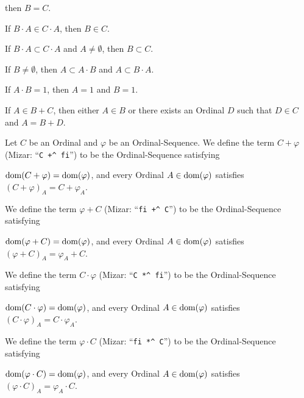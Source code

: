 \documentclass{article}
\begin{document}
\begin{thm}
  then $B=C$.
\item\label{ordinal3:34} If $B\cdot A\in C\cdot A$, then $B\in C$.
\item\label{ordinal3:35} If $B\cdot A\subset C\cdot A$ and $A\neq\emptyset$,
  then $B\subset C$.
\item\label{ordinal3:36} If $B\neq\emptyset$, then $A\subset A\cdot B$
  and $A\subset B\cdot A$.
\item\label{ordinal3:37} If $A\cdot B=1$, then $A=1$ and $B=1$.
\item\label{ordinal3:38} If $A\in B+C$,
  then either $A\in B$ or there exists an Ordinal $D$ such that $D\in C$
  and $A=B+D$.
\end{thm}

\begin{definition}
Let $C$ be an Ordinal and $\varphi$ be an Ordinal-Sequence.
We define the term $C+\varphi$ (Mizar: ``\verb#C +^ fi#'') to be the
Ordinal-Sequence satisfying
\begin{defn}
\item $\operatorname{dom}(C+\varphi)=\operatorname{dom}(\varphi)$, and every Ordinal $A\in\operatorname{dom}(\varphi)$
  satisfies $(C+\varphi)_{A}=C+\varphi_{A}$.
\end{defn}
We define the term $\varphi+C$ (Mizar: ``\verb#fi +^ C#'') to be the
Ordinal-Sequence satisfying
\begin{defn}
\item $\operatorname{dom}(\varphi+C)=\operatorname{dom}(\varphi)$, and every Ordinal $A\in\operatorname{dom}(\varphi)$
  satisfies $(\varphi+C)_{A}=\varphi_{A}+C$.
\end{defn}
We define the term $C\cdot\varphi$ (Mizar: ``\verb#C *^ fi#'') to be the
Ordinal-Sequence satisfying
\begin{defn}
\item $\operatorname{dom}(C\cdot\varphi)=\operatorname{dom}(\varphi)$, and every Ordinal $A\in\operatorname{dom}(\varphi)$
  satisfies $(C\cdot\varphi)_{A}=C\cdot\varphi_{A}$.
\end{defn}
We define the term $\varphi\cdot C$ (Mizar: ``\verb#fi *^ C#'') to be the
Ordinal-Sequence satisfying
\begin{defn}
\item $\operatorname{dom}(\varphi\cdot C)=\operatorname{dom}(\varphi)$, and every Ordinal $A\in\operatorname{dom}(\varphi)$
  satisfies $(\varphi\cdot C)_{A}=\varphi_{A}\cdot C$.
\end{defn}
\end{definition}
\end{document}

